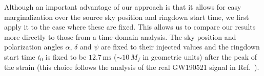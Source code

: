 Although an important advantage of our approach is that it allows for easy marginalization over the source sky position and ringdown start time, we first apply it to the case where these are fixed. 
This allows us to compare our results more directly to those from a time-domain analysis.
The sky position and polarization angles $\alpha$, $\delta$ and $\psi$ are fixed to their injected values and the ringdown start time $t_0$ is fixed to be $12.7\,\mathrm{ms}$ ($\sim 10\,M_f$ in geometric units) after the peak of the strain (this choice follows the analysis of the real GW190521 signal in Ref.~\cite{LIGOScientific:2020iuh}).


